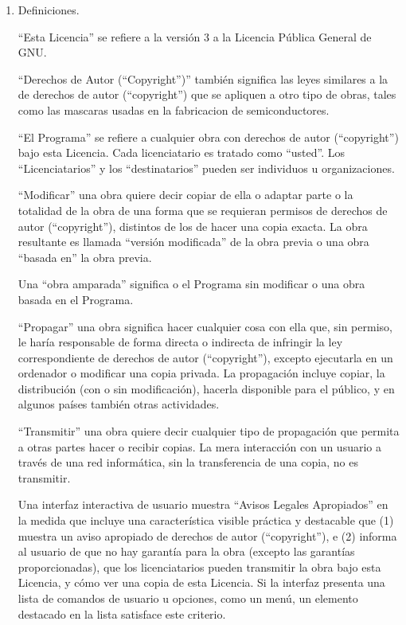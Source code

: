 \documentclass[11pt]{article}
\begin{document}
\begin{enumerate}

\addtocounter{enumi}{-1}

\item Definiciones.

``Esta Licencia'' se refiere a la versi\'{o}n 3 a la Licencia P\'{u}blica 
General de GNU.

``Derechos de Autor (``Copyright'')'' tambi\'{e}n significa las leyes similares a la de derechos de autor (``copyright'') 
que se apliquen a otro tipo de obras, tales como las mascaras usadas 
en la fabricacion de semiconductores.

``El Programa'' se refiere a cualquier obra con derechos de autor (``copyright'') 
bajo esta Licencia.  Cada licenciatario es tratado como ``usted''. 
Los ``Licenciatarios'' y los ``destinatarios'' pueden ser individuos u organizaciones.

``Modificar'' una obra quiere decir copiar de ella o adaptar parte o la 
totalidad de la obra de una forma que se requieran permisos de derechos de autor (``copyright''), 
distintos de los de hacer una copia exacta.  La obra resultante es 
llamada ``versi\'{o}n modificada'' de la obra previa o una obra ``basada en'' 
la obra previa.

Una ``obra amparada'' significa o el Programa sin modificar o una obra 
basada en el Programa.

``Propagar'' una obra significa hacer cualquier cosa con ella que, sin
permiso, le har\'{i}a responsable de forma directa o indirecta de infringir
la ley correspondiente de derechos de autor (``copyright''), excepto ejecutarla en un ordenador
o modificar una copia privada.  La propagaci\'{o}n incluye copiar, la 
distribuci\'{o}n (con o sin modificaci\'{o}n), hacerla disponible para el 
p\'{u}blico, y en algunos pa\'{i}ses tambi\'{e}n otras actividades.

``Transmitir'' una obra quiere decir cualquier tipo de propagaci\'{o}n que 
permita a otras partes hacer o recibir copias.  La mera interacci\'{o}n con
un usuario a trav\'{e}s de una red inform\'{a}tica, sin la transferencia de una 
copia, no es transmitir.

Una interfaz interactiva de usuario muestra ``Avisos Legales Apropiados''
en la medida que incluye una caracter\'{i}stica visible pr\'{a}ctica y 
destacable que (1) muestra un aviso apropiado de derechos de autor (``copyright''), e (2)
informa al usuario de que no hay garant\'{i}a para la obra (excepto las 
garant\'{i}as proporcionadas), que los licenciatarios pueden transmitir la 
obra bajo esta Licencia, y c\'{o}mo ver una copia de esta Licencia. 
Si la interfaz presenta una lista de comandos de usuario u opciones, 
como un men\'{u}, un elemento destacado en la lista satisface este criterio.


\end{enumerate}
\end{document}
